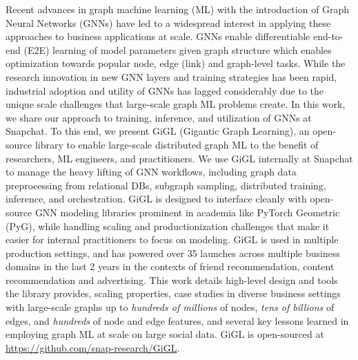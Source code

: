 Recent advances in graph machine learning (ML) with the introduction of Graph Neural Networks (GNNs) have led to a widespread interest in applying these approaches to business applications at scale. GNNs enable differentiable end-to-end (E2E) learning of model parameters given graph structure which enables optimization towards popular node, edge (link) and graph-level tasks.  While the research innovation in new GNN layers and training strategies has been rapid, industrial adoption and utility of GNNs has lagged considerably due to the unique scale challenges that large-scale graph ML problems create. In this work, we share our approach to training, inference, and utilization of GNNs at Snapchat.  To this end, we present GiGL (Gigantic Graph Learning), an open-source library to enable large-scale distributed graph ML to the benefit of researchers, ML engineers, and practitioners. We use GiGL internally at Snapchat to manage the heavy lifting of GNN workflows, including graph data preprocessing from relational DBs, subgraph sampling, distributed training, inference, and orchestration.  GiGL is designed to interface cleanly with open-source GNN modeling libraries prominent in academia like PyTorch Geometric (PyG), while handling scaling and productionization challenges that make it easier for internal practitioners to focus on modeling. GiGL is used in multiple production settings, and has powered over 35 launches across multiple business domains in the last 2 years in the contexts of friend recommendation, content recommendation and advertising.  This work details high-level design and tools the library provides,  scaling properties, case studies in diverse business settings with large-scale graphs up to \emph{hundreds of millions} of nodes, \emph{tens of billions} of edges, and \emph{hundreds} of node and edge features, and several key lessons learned in employing graph ML at scale on large social data.  GiGL is open-sourced at \url{https://github.com/snap-research/GiGL}.